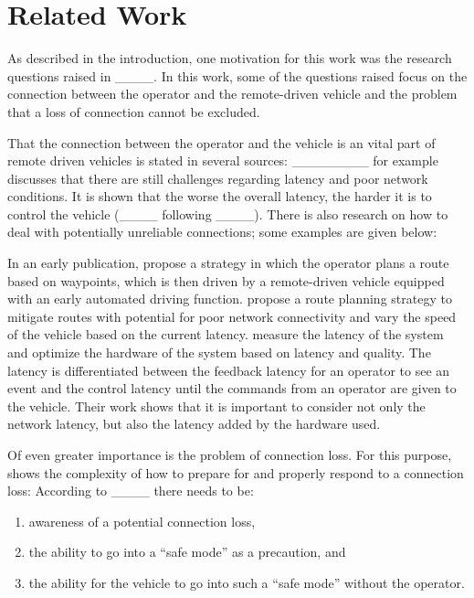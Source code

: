 \section{Related Work}
As described in the introduction, one motivation for this work was the research questions raised in ____. 
In this work, some of the questions raised focus on the connection between the operator and the remote-driven vehicle and the problem that a loss of connection cannot be excluded. 

That the connection between the operator and the vehicle is an vital part of remote driven vehicles is stated in several sources:
________ for example discusses that there are still challenges regarding latency and poor network conditions.
It is shown that the worse the overall latency, the harder it is to control the vehicle (____ following ____).
There is also research on how to deal with potentially unreliable connections; some examples are given below:

In an early publication, \textcite{Kay1995} propose a strategy in which the operator plans a route based on waypoints, which is then driven by a remote-driven vehicle equipped with an early automated driving function.
\textcite{Neumeier2019} propose a route planning strategy to mitigate routes with potential for poor network connectivity and vary the speed of the vehicle based on the current latency. 
\textcite{Georg2020} measure the latency of the system and optimize the hardware of the system based on latency and quality. 
The latency is differentiated between the feedback latency for an operator to see an event and the control latency until the commands from an operator are given to the vehicle.
Their work shows that it is important to consider not only the network latency, but also the latency added by the hardware used. 

Of even greater importance is the problem of connection loss.
For this purpose, \textcite{Zhang2020} shows the complexity of how to prepare for and properly respond to a connection loss:
According to ____ there needs to be: 
\begin{enumerate}
    \item awareness of a potential connection loss,
    \item the ability to go into a ``safe mode'' as a precaution, and
    \item the ability for the vehicle to go into such a ``safe mode'' without the operator.
\end{enumerate}

